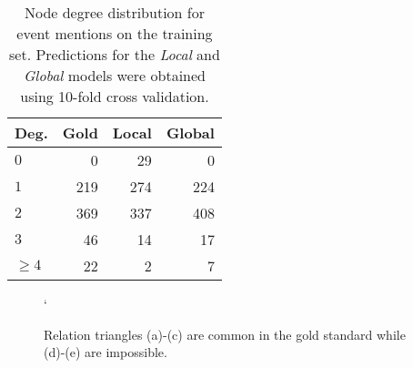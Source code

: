 \begin{table}[t]
{\footnotesize
\hfill{}
\begin{tabular}{|l|r|r|r|}
\hline
\textbf{Deg.} &\textbf{Gold}&\textbf{Local} & \textbf{Global}\\
\hline
$0$            &     0        &    29       &   0 \\ 
$1$            &     219        &    274       & 224  \\ 
$2$            &     369        &    337       &  408  \\ 
$3$            &     46        &     14     &  17 \\ 
$\geq4$           &     22        &     2      &  7 \\
\hline
\end{tabular}}
\hfill{}
\caption{Node degree distribution for event mentions on the training set. Predictions for the \emph{Local} and \emph{Global} models were obtained using 10-fold cross validation.}
\label{tab:degree}
\end{table}

\begin{figure*}[ht]
  \begin{center}
      
  \end{center}
  \caption{Relation triangles (a)-(c) are common in the gold standard while (d)-(e) are impossible.}`
  \label{fig:triad}
\end{figure*}






















